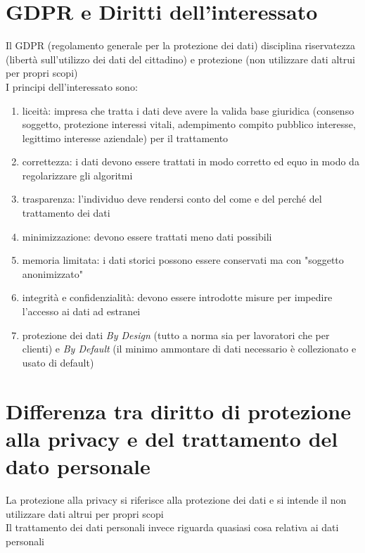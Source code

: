 \documentclass[8pt,oneside,a4paper]{article}
\begin{document}
	\section{GDPR e Diritti dell'interessato}
	Il GDPR (regolamento generale per la protezione dei dati) disciplina riservatezza (libertà sull'utilizzo dei dati del cittadino) e protezione (non utilizzare dati altrui per propri scopi)\\
	I principi dell'interessato sono:
	\begin{enumerate}
		\item liceità: impresa che tratta i dati deve avere la valida base giuridica (consenso soggetto, protezione interessi vitali, adempimento compito pubblico interesse, legittimo interesse aziendale) per il trattamento
		\item correttezza: i dati devono essere trattati in modo corretto ed equo in modo da regolarizzare gli algoritmi
		\item trasparenza: l'individuo deve rendersi conto del come e del perché del trattamento dei dati
		\item minimizzazione: devono essere trattati meno dati possibili
		\item memoria limitata: i dati storici possono essere conservati ma con "soggetto anonimizzato"
		\item integrità e confidenzialità: devono essere introdotte misure per impedire l'accesso ai dati ad estranei
		\item protezione dei dati \textit{By Design} (tutto a norma sia per lavoratori che per clienti) e \textit{By Default} (il minimo ammontare di dati necessario è collezionato e usato di default)
	\end{enumerate}
	\section{Differenza tra diritto di protezione alla privacy e del trattamento del dato personale}
	La protezione alla privacy si riferisce alla protezione dei dati e si intende il non utilizzare dati altrui per propri scopi\\
	Il trattamento dei dati personali invece riguarda quasiasi cosa relativa ai dati personali
\end{document}

